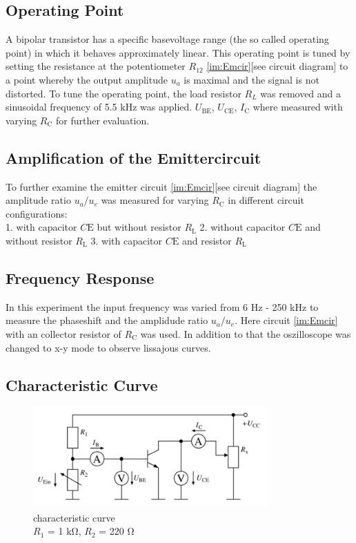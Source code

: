 \documentclass[11pt, a4paper]{article}
\begin{document}
\subsection{Operating Point}
A bipolar transistor has a specific basevoltage range (the so called operating point) in which it behaves approximately linear. This operating point
is tuned by setting the resistance at the potentiometer $R_{12}$ \ref{im:Emcir}[see circuit diagram] to a point whereby the output amplitude $u_a$ is maximal and the signal is not distorted.
To tune the operating point, the load resistor $R_L$ was removed and a sinusoidal frequency of 5.5 \si{\kilo\hertz} was applied. 
$U_{\text{BE}}$, $U_{\text{CE}}$, $I_{\text{C}}$ where measured with varying $R_{\text{C}}$ for further evaluation.
\subsection{Amplification of the Emittercircuit}
To further examine the emitter circuit \ref{im:Emcir}[see circuit diagram] the amplitude ratio $u_a / u_e$ was measured for varying $R_{\text{C}}$ in different circuit configurations:\\
1. with capacitor $C{\text{E}}$ but without resistor $R_{\text{L}}$
2. without capacitor $C{\text{E}}$ and without resistor $R_{\text{L}}$
3. with capacitor $C{\text{E}}$ and resistor $R_{\text{L}}$
\subsection{Frequency Response}
In this experiment the input frequency was varied from 6 \si{\hertz} - 250 \si{\kilo\hertz} to measure the phaseshift and the amplidude ratio $u_a / u_e$. 
Here circuit \ref{im:Emcir} with an collector resistor of $R_{\text{C}}$ was used. In addition to that the oszilloscope was changed to x-y mode to observe lissajous curves.
\subsection{Characteristic Curve}
\begin{figure}[h]
    \centering
    \includegraphics[width=0.8\textwidth]{bilder/characteristicCurve.png}
    \caption{characteristic curve \\
    $R_1$ = 1 \si{\kilo\ohm}, $R_2$ = 220 \si{\ohm}}
    \label{im:Charcurcir}
\end{figure}
\end{document}
